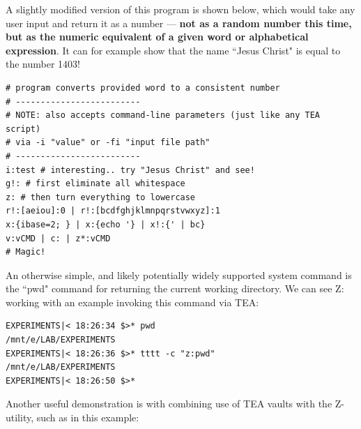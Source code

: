 \documentclass[a4paper, 18pt]{book} %
\begin{document}
{{{\vspace{2em}

A slightly modified version of this program is shown below, which would take any user input and return it as a number --- \textbf{not as a random number this time, but as the numeric equivalent of a given word or alphabetical expression}. It can for example show that the name ``Jesus Christ" is equal to the number 1403!


\vspace{2em}

  \begin{tcolorbox}[teaterminalstyle, title=Z: EXAMPLE 2: Numeric Expression Equivalent of Alphabetical Expressions, breakable]
  \begin{lstlisting}[language=TEA,breaklines=true,]
# program converts provided word to a consistent number
# -------------------------
# NOTE: also accepts command-line parameters (just like any TEA script)
# via -i "value" or -fi "input file path"
# -------------------------
i:test # interesting.. try "Jesus Christ" and see!
g!: # first eliminate all whitespace
z: # then turn everything to lowercase
r!:[aeiou]:0 | r!:[bcdfghjklmnpqrstvwxyz]:1
x:{ibase=2; } | x:{echo '} | x!:{' | bc}
v:vCMD | c: | z*:vCMD
# Magic!
   \end{lstlisting}
  \end{tcolorbox}

\vspace{2em}


An otherwise simple, and likely potentially widely supported system command is the ``pwd" command for returning the current working directory. We can see Z: working with an example invoking this command via TEA:


\vspace{2em}

{
  \begin{tcolorbox}[myterminalstyle, title=Z: EXAMPLE 3: Calling System Commands from TEA on the CLI]
  \begin{lstlisting}
EXPERIMENTS|< 18:26:34 $>* pwd
/mnt/e/LAB/EXPERIMENTS
EXPERIMENTS|< 18:26:36 $>* tttt -c "z:pwd"
/mnt/e/LAB/EXPERIMENTS
EXPERIMENTS|< 18:26:50 $>*             
  \end{lstlisting}
  \end{tcolorbox}
}

\vspace{2em}


Another useful demonstration is with combining use of TEA vaults with the Z-utility, such as in this example:

}}}
\end{document}
